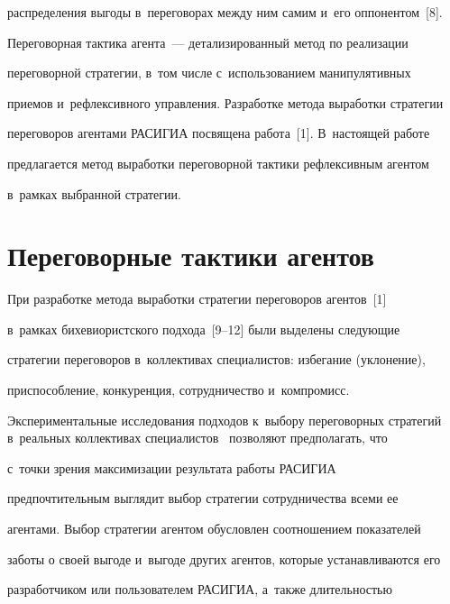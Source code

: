 распределения выгоды в~переговорах между ним самим и~его оппонентом~[8]. 


Переговорная тактика агента~--- детализированный метод по реализации 


переговорной стратегии, в~том числе с~использованием манипулятивных 


приемов и~рефлексивного управления. Разработке метода выработки стратегии 


переговоров агентами РАСИГИА посвящена работа~[1]. В~настоящей работе 


предлагается метод выработки переговорной тактики рефлексивным агентом 


в~рамках выбранной стратегии. 





\vspace*{-6pt}


  


\section{Переговорные тактики агентов}





\vspace*{-6pt}





  При разработке метода выработки стратегии переговоров агентов~[1] 


в~рамках бихевиористского подхода~[9--12] были выделены следующие 


стратегии переговоров в~коллективах специалистов: избегание (уклонение), 


приспособление, конкуренция, сотрудничество и~компромисс. 


Экспериментальные исследования подходов к~выбору переговорных стратегий в~реальных коллективах специалистов~\cite{9-lis} позволяют предполагать, что 


с~точки зрения максимизации результата работы \mbox{РАСИГИА} 


предпочтительным выглядит выбор стратегии сотрудничества всеми ее 


агентами. Выбор стратегии агентом обусловлен соотношением показателей 


заботы о своей выгоде и~выгоде других агентов, которые устанавливаются его 


разработчиком или пользователем \mbox{РАСИГИА}, а~также длительностью 


